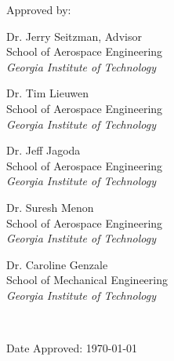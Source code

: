 \thispagestyle{empty}

\begin{center}
  \begin{singlespace}
    \thetitle
  \end{singlespace}
\end{center}

\vfill 

Approved by:

\begin{minipage}[t]{0.4\textwidth}
  \begin{singlespace}
    Dr. Jerry Seitzman, Advisor\\
    School of Aerospace Engineering\\
    \emph{Georgia Institute of Technology}
  \end{singlespace}

  \begin{singlespace}
    Dr. Tim Lieuwen\\
    School of Aerospace Engineering\\
    \emph{Georgia Institute of Technology}
  \end{singlespace}

  \begin{singlespace}
    Dr. Jeff Jagoda\\
    School of Aerospace Engineering\\
    \emph{Georgia Institute of Technology}
  \end{singlespace}
\end{minipage}
\hfill
\begin{minipage}[t]{0.4\textwidth}
  \begin{singlespace}
    Dr. Suresh Menon\\
    School of Aerospace Engineering\\
    \emph{Georgia Institute of Technology}
  \end{singlespace}

  \begin{singlespace}
    Dr. Caroline Genzale\\
    School of Mechanical Engineering\\
    \emph{Georgia Institute of Technology}
  \end{singlespace}
  
  \ \vfill

  Date Approved: \today
\end{minipage}
